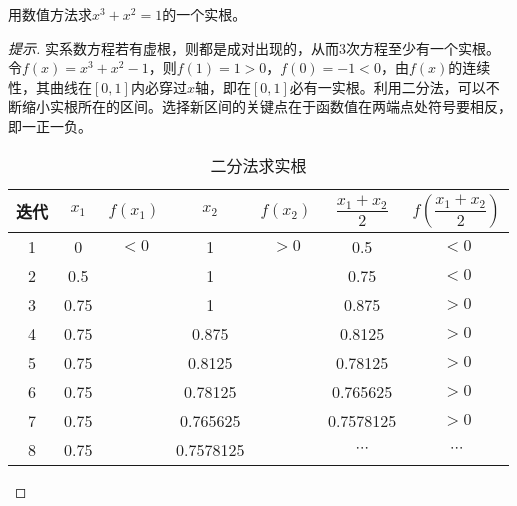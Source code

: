 \begin{example}
  用数值方法求$x^3+x^2=1$的一个实根。
\end{example}
\begin{proof}[提示]
  实系数方程若有虚根，则都是成对出现的，从而3次方程至少有一个实根。令$f(x)=x^3+x^2-1$，则$f(1)=1>0$，$f(0)=-1<0$，由$f(x)$的连续性，其曲线在$[0,1]$内必穿过$x$轴，即在$[0,1]$必有一实根。利用二分法，可以不断缩小实根所在的区间。选择新区间的关键点在于函数值在两端点处符号要相反，即一正一负。
  \begin{table}[htbp]
    \centering
    \caption{二分法求实根}
    \label{tab:real-root-by-binary-section}
    \begin{tabular}{ccccccc}
      \hline
      迭代 & $x_1$ & $f(x_1)$ & $x_2$ & $f(x_2)$ & $\dfrac{x_1+x_2}{2}$ & $f\left(\dfrac{x_1+x_2}{2}\right)$\\\hline
      1 & 0 & $<0$ & 1 & $>0$ & 0.5  & $< 0$\\
      2 & 0.5 &  & 1 &   & 0.75 & $<0$\\
      3 & 0.75 & & 1 &   & 0.875 & $>0$\\
      4 & 0.75 & & 0.875&& 0.8125 & $ >0$\\
      5 & 0.75 & & 0.8125&& 0.78125 & $>0$\\
      6 & 0.75 & & 0.78125&& 0.765625 & $>0$\\
      7 & 0.75 & & 0.765625&& 0.7578125 & $>0$\\
      8 & 0.75 & & 0.7578125&& $\cdots$ & $\cdots$\\
      \hline
    \end{tabular}
  \end{table}
\end{proof}